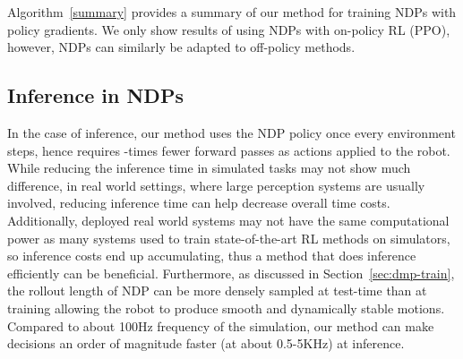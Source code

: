 \documentclass{article}
\newcommand{\our}{NDP\xspace}
\newcommand{\ours}{NDPs\xspace}
\begin{document}
Algorithm~\ref{summary} provides a summary of our method for training \ours with policy gradients. We only show results of using \ours with on-policy RL (PPO), however, \ours can similarly be adapted to off-policy methods.

\subsection{Inference in NDPs}
\label{sec:dmp-infer}
In the case of inference, our method uses the \our policy  once every  environment steps, hence requires -times fewer forward passes as actions applied to the robot. While reducing the inference time in simulated tasks may not show much difference, in real world settings, where large perception systems are usually involved, reducing inference time can help decrease overall time costs. Additionally, deployed real world systems may not have the same computational power as many systems used to train state-of-the-art RL methods on simulators, so inference costs end up accumulating, thus a method that does inference efficiently can be beneficial. Furthermore, as discussed in Section~\ref{sec:dmp-train}, the rollout length of \our can be more densely sampled at test-time than at training allowing the robot to produce smooth and dynamically stable motions. Compared to about 100Hz frequency of the simulation, our method can make decisions an order of magnitude faster (at about 0.5-5KHz) at inference.
\end{document}
